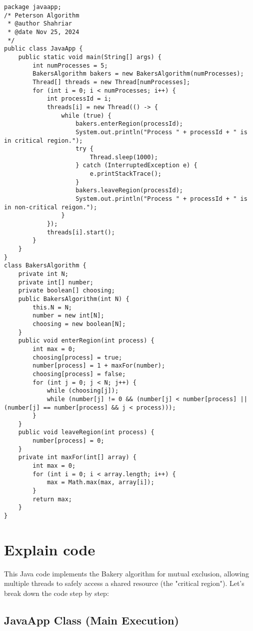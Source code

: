 \documentclass{report}
\begin{document}
\begin{lstlisting}
package javaapp;
/* Peterson Algorithm
 * @author Shahriar
 * @date Nov 25, 2024
 */
public class JavaApp {
    public static void main(String[] args) {
        int numProcesses = 5;
        BakersAlgorithm bakers = new BakersAlgorithm(numProcesses);
        Thread[] threads = new Thread[numProcesses];
        for (int i = 0; i < numProcesses; i++) {
            int processId = i;
            threads[i] = new Thread(() -> {
                while (true) {
                    bakers.enterRegion(processId);
                    System.out.println("Process " + processId + " is in critical region.");
                    try {
                        Thread.sleep(1000);
                    } catch (InterruptedException e) {
                        e.printStackTrace();
                    }
                    bakers.leaveRegion(processId);
                    System.out.println("Process " + processId + " is in non-critical reigon.");
                }
            });
            threads[i].start();
        }
    }
}
class BakersAlgorithm {
    private int N;
    private int[] number;
    private boolean[] choosing;
    public BakersAlgorithm(int N) {
        this.N = N;
        number = new int[N];
        choosing = new boolean[N];
    }
    public void enterRegion(int process) {
        int max = 0;
        choosing[process] = true;
        number[process] = 1 + maxFor(number);
        choosing[process] = false;
        for (int j = 0; j < N; j++) {
            while (choosing[j]);
            while (number[j] != 0 && (number[j] < number[process] || (number[j] == number[process] && j < process)));
        }
    }
    public void leaveRegion(int process) {
        number[process] = 0;
    }
    private int maxFor(int[] array) {
        int max = 0;
        for (int i = 0; i < array.length; i++) {
            max = Math.max(max, array[i]);
        }
        return max;
    }
}

\end{lstlisting}

\section{Explain code}

This Java code implements the Bakery algorithm for mutual exclusion, allowing multiple threads to safely access a shared resource (the "critical region"). Let's break down the code step by step:

\subsection{JavaApp Class (Main Execution)}
\end{document}
